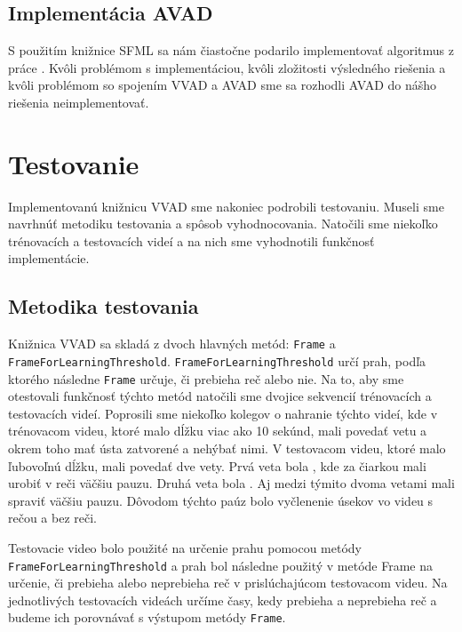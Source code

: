 \section{Implementácia AVAD}
S použitím knižnice SFML \cite{SFML} sa nám čiastočne podarilo implementovať algoritmus z práce  \cite{moattar2009simple}. 
Kvôli problémom s implementáciou, kvôli zložitosti výsledného riešenia a kvôli problémom so spojením VVAD a AVAD sme sa rozhodli AVAD do nášho riešenia neimplementovať.

\chapter{Testovanie}
Implementovanú knižnicu VVAD sme nakoniec podrobili testovaniu.
Museli sme navrhnúť metodiku testovania a spôsob vyhodnocovania. 
Natočili sme niekoľko tré\-no\-va\-cích a testovacích videí a na nich sme vyhodnotili funkčnosť implementácie. 

\section{Metodika testovania}
Knižnica VVAD sa skladá z dvoch hlavných metód: \texttt{Frame} a \texttt{Frame\-For\-Learning\-Threshold}. 
\texttt{Frame\-For\-Learning\-Threshold} určí prah, podľa ktorého následne \texttt{Frame} určuje, či prebieha reč alebo nie.
Na to, aby sme otestovali funkčnosť týchto metód natočili sme dvojice sekvencií trénovacích a testovacích videí. 
Poprosili sme niekoľko kolegov o nahranie týchto videí, kde v trénovacom videu, ktoré malo dĺžku viac ako 10 sekúnd, mali povedať vetu  a okrem toho mať ústa zatvorené a nehýbať nimi.
V testovacom videu, ktoré malo ľubovoľnú dĺžku, mali povedať dve vety. Prvá veta bola , kde za čiarkou mali urobiť v reči väčšiu pauzu. 
Druhá veta bola . 
Aj medzi týmito dvoma vetami mali spraviť väčšiu pauzu. 
Dôvodom týchto paúz bolo vyčlenenie úsekov vo videu s rečou a bez reči.

Testovacie video bolo použité na určenie prahu pomocou metódy \texttt{Frame\-For\-Learning\-Threshold} a prah bol následne použitý v metóde Frame na určenie, či prebieha alebo neprebieha reč v prislúchajúcom testovacom videu. 
Na jednotlivých testovacích videách určíme časy, kedy prebieha a neprebieha reč a budeme ich porovnávať s výstupom metódy \texttt{Frame}.

